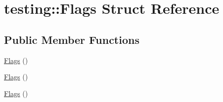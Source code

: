 \hypertarget{structtesting_1_1_flags}{}\section{testing\+::Flags Struct Reference}
\label{structtesting_1_1_flags}
\subsection*{Public Member Functions}
\begin{DoxyCompactItemize}
\item 
\mbox{\hyperlink{structtesting_1_1_flags_a41dc8942bec08ebc7f74dee545e6ad7e}{Flags}} ()
\item 
\mbox{\hyperlink{structtesting_1_1_flags_a41dc8942bec08ebc7f74dee545e6ad7e}{Flags}} ()
\item 
\mbox{\hyperlink{structtesting_1_1_flags_a41dc8942bec08ebc7f74dee545e6ad7e}{Flags}} ()
\end{DoxyCompactItemize}
